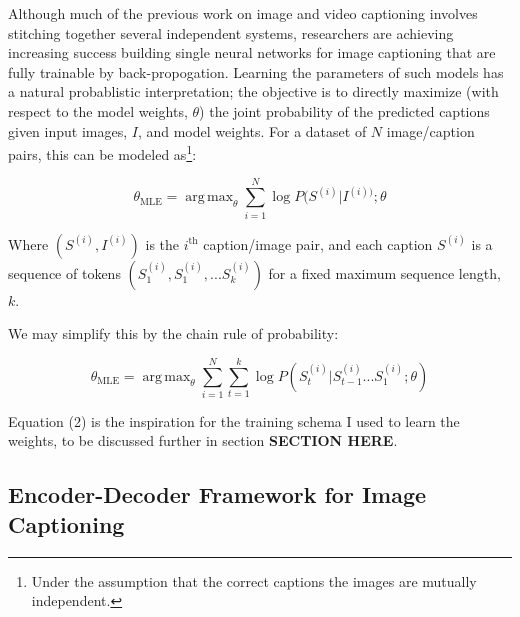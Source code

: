 \documentclass[letterpaper, 10 pt, conference]{ieeeconf}
\DeclareMathOperator*{\argmax}{arg\,max}
\begin{document}
Although much of the previous work on image and video captioning involves stitching together several independent systems, researchers are achieving increasing success building single neural networks for image captioning that are fully trainable by back-propogation. Learning the parameters of such models has a natural probablistic interpretation; the objective is to directly maximize (with respect to the model weights, $\theta$) the joint probability of the predicted captions given input images, $I$, and model weights. For a dataset of $N$ image/caption pairs, this can be modeled as\footnote{Under the assumption that the correct captions the images are mutually independent.}:

\begin{equation}
\theta_{\text{MLE}} = \argmax_{\theta}{\sum_{i = 1}^N{\log P(S^{(i)}|I^{(i))}; \theta}}
\end{equation} 

Where $(S^{(i)}, I^{(i)})$ is the $i^{\text{th}}$ caption/image pair, and each caption $S^{(i)}$ is a sequence of tokens $(S^{(i)}_1, S^{(i)}_1, ... S^{(i)}_k)$ for a fixed maximum sequence length, $k$. 

We may simplify this by the chain rule of probability:

\begin{equation}
\theta_{\text{MLE}} = \argmax_{\theta}{\sum_{i = 1}^N{\sum_{t = 1}^k{\log P(S_t^{(i)}|S_{t - 1}^{(i)} ... S_{1}^{(i)}; \theta)}}}
\end{equation} 

Equation (2) is the inspiration for the training schema I used to learn the weights, to be discussed further in section \textbf{SECTION HERE}.

\subsection{Encoder-Decoder Framework for Image Captioning}
\end{document}

